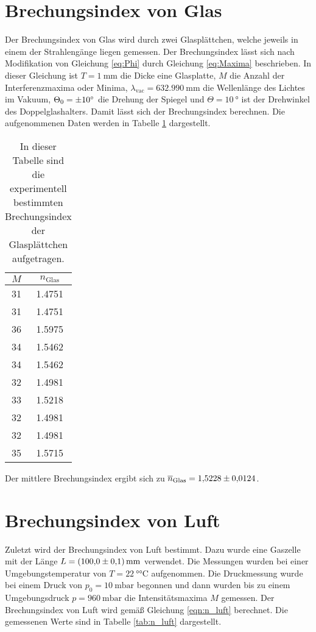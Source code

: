 \section{Brechungsindex von Glas}
\label{sec:n_glas}
Der Brechungsindex von Glas wird durch zwei Glasplättchen, welche jeweils in einem der Strahlengänge liegen gemessen. Der Brechungsindex lässt sich nach Modifikation von Gleichung 
\ref{eq:Phi} durch Gleichung \ref{eq:Maxima} beschrieben. In dieser Gleichung ist $T = \qty{1}{\milli\metre}$ die Dicke eine Glasplatte, $M$ die Anzahl der Interferenzmaxima oder 
Minima, $\lambda_\mathrm{vac} = \qty{632.990}{\milli\metre}$ die Wellenlänge des Lichtes im Vakuum, $\Theta_0 = \qty{\pm 10}{\degree}$ die Drehung der Spiegel und 
$\Theta = \qty{10}{\degree}$ ist der Drehwinkel des Doppelglashalters. Damit lässt sich der Brechungsindex berechnen. Die aufgenommenen Daten werden in Tabelle \ref{tab:n_glas} 
dargestellt.

\begin{table}[htbp] 
  \centering 
  \begin{tabular}{c c} 
      \toprule $M$ & $n_\mathrm{Glas}$\\ 
      \midrule 
      31 & 1.4751 \\
      31 & 1.4751 \\
      36 & 1.5975 \\
      34 & 1.5462 \\
      34 & 1.5462 \\
      32 & 1.4981 \\
      33 & 1.5218 \\
      32 & 1.4981 \\
      32 & 1.4981 \\
      35 & 1.5715 \\

      \bottomrule 
  \end{tabular} 
  \caption[Tabelle]{In dieser Tabelle sind die experimentell bestimmten Brechungsindex der Glasplättchen aufgetragen.} 
  \label{tab:n_glas} 
\end{table}

Der mittlere Brechungsindex ergibt sich zu $\overline{n}_\mathrm{Glas} = \num{1.5228 \pm 0.0124}$.

\section{Brechungsindex von Luft}
\label{sec:n_luft}
Zuletzt wird der Brechungsindex von Luft bestimmt. Dazu wurde eine Gaszelle mit der Länge $L = \qty{100 \pm 0.1}{\milli\metre}$ verwendet. Die Messungen wurden bei einer Umgebungstemperatur 
von $T = \qty{22}{\degree\celsius}$ aufgenommen. Die Druckmessung wurde bei einem Druck von 
$p_0 = \qty{10}{\milli\bar}$ begonnen und dann wurden bis zu einem Umgebungsdruck $p = \qty{960}{\milli\bar}$ die Intensitätsmaxima $M$ gemessen. Der Brechungsindex von Luft wird gemäß 
Gleichung \ref{eqn:n_luft} berechnet. Die gemessenen Werte sind in Tabelle \ref{tab:n_luft} dargestellt.


